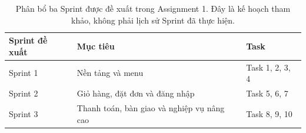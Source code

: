 \begin{table}[htbp]
\centering
\small
\begin{tabularx}{\textwidth}{@{}p{1.5cm}p{3.1cm}X@{}}
\toprule
Sprint đề xuất & Mục tiêu & Task \\
\midrule
Sprint 1 & Nền tảng và menu & Task 1, 2, 3, 4 \\
Sprint 2 & Giỏ hàng, đặt đơn và đăng nhập & Task 5, 6, 7 \\
Sprint 3 & Thanh toán, bàn giao và nghiệp vụ nâng cao & Task 8, 9, 10 \\
\bottomrule
\end{tabularx}
\caption{Phân bổ ba Sprint được đề xuất trong Assignment 1. Đây là kế hoạch tham khảo, không phải lịch sử Sprint đã thực hiện.}
\label{tab:a1-sprint-plan}
\end{table}
